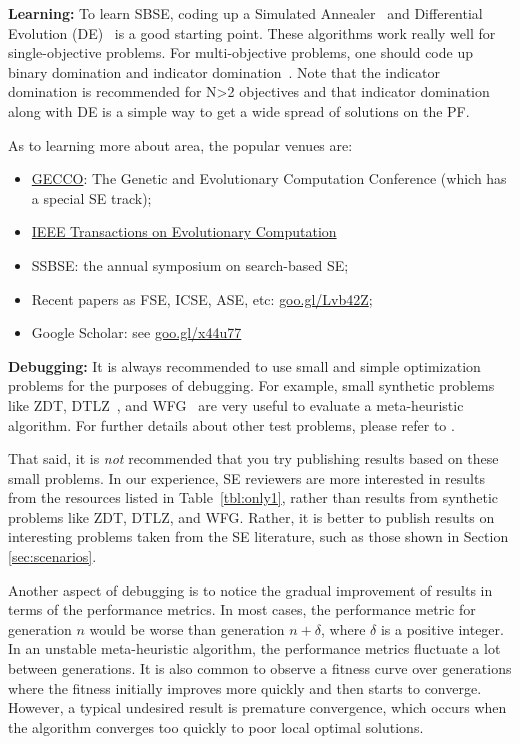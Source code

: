 \documentclass[sigconf,anonymous,review]{acmart}
\newcommand\TODO[1]{\textcolor{ScarletRed}{\textbf{\colorbox{yellow}{\small TODO:}} \emph{#1}}\xspace}
\begin{document}
 
\noindent\textbf{Learning: } To learn SBSE, coding up a Simulated Annealer~\cite{van1987simulated} and Differential Evolution (DE)~\cite{storn97} is a good starting point.  These algorithms work really well for single-objective problems. For multi-objective problems, one should code up binary domination and indicator domination~\cite{zitzler2001spea2}. Note that the indicator domination is recommended for N>2 objectives and that indicator domination along with DE is a simple way to get a wide spread of solutions on the PF. 

As to learning more about area, the popular venues are: 
\begin{itemize}
\item \href{http://gecco-2018.sigevo.org/index.html/HomePage}{GECCO}: The Genetic and Evolutionary Computation Conference (which has a special SE track);
\item \href{http://ieeexplore.ieee.org/xpl/RecentIssue.jsp?punumber=4235}{IEEE Transactions on Evolutionary Computation}
\item SSBSE: the annual symposium on search-based SE;
\item Recent papers   as FSE, ICSE, ASE, etc: \url{goo.gl/Lvb42Z};
\item Google Scholar: see  \url{goo.gl/x44u77}
\end{itemize}
  \noindent\textbf{Debugging: } It is always recommended to use small and simple {optimization problems} for the purposes of debugging. For example, small synthetic {problems} like ZDT, DTLZ~\cite{deb2005scalable}, and WFG~\cite{huband2006review} are very useful to evaluate a meta-heuristic algorithm. For further details about other test problems, please refer to \cite{huband2006review}.  
  
  That said, it is {\em not} recommended that you try publishing results based on these small {problems}. In our experience, SE reviewers are more interested in results from the resources listed in Table~\ref{tbl:only1}, rather than results from   synthetic {problems} like ZDT, DTLZ, and WFG. Rather, it is better to publish results on interesting
  problems taken from the SE literature, such as those shown in Section \ref{sec:scenarios}.
  
  Another aspect of debugging is to notice the gradual improvement of results in terms of the performance metrics. In most cases, the performance metric for generation $n$ would be worse than generation $n+\delta$, where $\delta$ is a positive integer. In an unstable meta-heuristic algorithm, the performance metrics fluctuate a lot between generations. 
  {It is also common to observe a fitness curve over generations where the fitness initially improves more quickly and then starts to converge. However, a typical undesired result is premature convergence, which occurs when the algorithm converges too quickly to poor local optimal solutions.}
\end{document}
